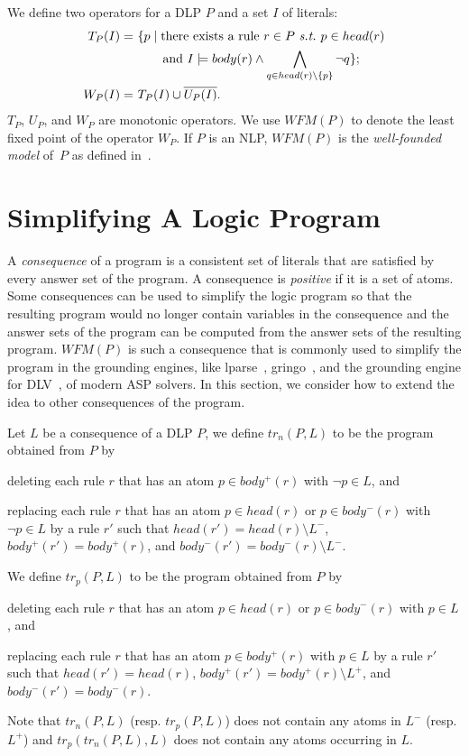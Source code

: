 \documentclass{article}
\makeatletter
\newenvironment{tight_enumerate}{
\begin{enumerate}
  \setlength{\itemsep}{0pt}%
  \setlength{\topsep}{0pt}%
  \setlength{\partopsep}{0pt}%
  \setlength{\parskip}{0pt}%
  \setlength{\parsep}{0pt}%
}{\end{enumerate}}
\newcommand\st{{\it s.t.\@ }}
\newcommand{\trn}{tr_n}
\newcommand{\trp}{tr_p}
\newcommand{\WFM}{W\!F\!M}
\makeatother
\begin{document}
We define two operators for a DLP $P$ and a set $I$ of literals:
\begin{align*}
  T_P(I) =&\ \{ p\mid \text{there exists a rule $r\in P$ \st $p\in head(r)$}\\ &\ \hspace{.7cm}\text{and $I\models body(r)\land \bigwedge_{q\in head(r)\setminus \{p\}} \neg q$}\};\\
  W_P(I) =&\ T_P(I) \cup \overline{U_P(I)}.
\end{align*}
$T_P$, $U_P$, and $W_P$ are monotonic operators.
We use $\WFM(P)$ to denote the least fixed point of the operator $W_P$. If $P$ is an NLP, $\WFM(P)$ is the {\em well-founded model} of~$P$ as defined in~\cite{van1991well}.


\section{Simplifying A Logic Program}

A {\em consequence} of a program is a consistent set of literals that are satisfied by every answer set of the program.
A consequence is {\em positive} if it is a set of atoms.
Some consequences can be used to simplify the logic program so that the resulting program would no longer contain variables in the consequence and the answer sets of the program can be computed from the answer sets of the resulting program.
$\WFM(P)$ is such a consequence that is commonly used to simplify the program in the grounding engines, like lparse~\cite{syrjanen2000lparse}, gringo~\cite{gebser2007gringo}, and the grounding engine for DLV~\cite{leone2002dlv}, of modern ASP solvers. In this section, we consider how to extend the idea to other consequences of the program.

Let $L$ be a consequence of a DLP $P$, we define $\trn(P, L)$ to be the program obtained from $P$ by
\begin{tight_enumerate}
  \item deleting each rule $r$ that has an atom $p\in body^+(r)$ with $\neg p\in L$, and
  \item replacing each rule $r$ that has an atom $p\in head(r)$ or $p\in body^-(r)$ with $\neg p\in L$ by a rule $r'$ such that
  $head(r') = head(r)\setminus L^-$, $body^+(r') = body^+(r)$, and $body^-(r') = body^-(r)\setminus L^-$.
\end{tight_enumerate}
We define $\trp(P, L)$ to be the program obtained from $P$ by
\begin{tight_enumerate}
  \item deleting each rule $r$ that has an atom $p\in head(r)$ or $p\in body^-(r)$ with $p\in L$, and
  \item replacing each rule $r$ that has an atom $p\in body^+(r)$ with $p\in L$ by a rule $r'$ such that
  $head(r') = head(r)$, $body^+(r') = body^+(r)\setminus L^+$, and $body^-(r') = body^-(r)$.
\end{tight_enumerate}
Note that $\trn(P, L)$ (resp. $\trp(P, L)$) does not contain any atoms in $L^-$ (resp. $L^+$) and $\trp(\trn(P, L), L)$ does not contain any atoms occurring in $L$.
\end{document}
